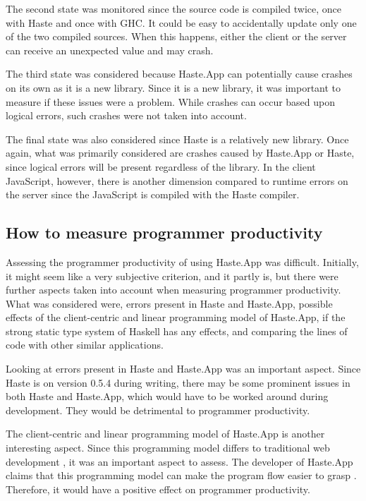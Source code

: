\documentclass[a4paper]{article}
\begin{document}
The second state was monitored since the source code is compiled twice, once with Haste and once with GHC. It could be easy to accidentally update only one of the two compiled sources. When this happens, either the client or the server can receive an unexpected value and may crash.

The third state was considered because Haste.App can potentially cause crashes on its own as it is a new library. Since it is a new library, it was important to measure if these issues were a problem. While crashes can occur based upon logical errors, such crashes were not taken into account. 

The final state was also considered since Haste is a relatively new library. Once again, what was primarily considered are crashes caused by Haste.App or Haste, since logical errors will be present regardless of the library. In the client JavaScript, however, there is another dimension compared to runtime errors on the server since the JavaScript is compiled with the Haste compiler. 



\subsection{How to measure programmer productivity}
\label{sub:method-programmer-productivity}
Assessing the programmer productivity of using Haste.App was difficult. Initially, it might seem like a very subjective criterion, and it partly is, but there were further aspects taken into account when measuring programmer productivity. What was considered were, errors present in Haste and Haste.App, possible effects of the client-centric and linear programming model of Haste.App, if the strong static type system of Haskell has any effects, and comparing the lines of code with other similar applications.

Looking at errors present in Haste and Haste.App was an important aspect. Since Haste is on version 0.5.4 during writing, there may be some prominent issues in both Haste and Haste.App, which would have to be worked around during development. They would be detrimental to programmer productivity.

The client-centric and linear programming model of Haste.App is another interesting aspect. Since this programming model differs to traditional web development \cite{ekblad2015seamless}, it was an important aspect to assess. The developer of Haste.App claims that this programming model can make the program flow easier to grasp \cite{ekblad2015seamless}. Therefore, it would have a positive effect on programmer productivity.
\end{document}
